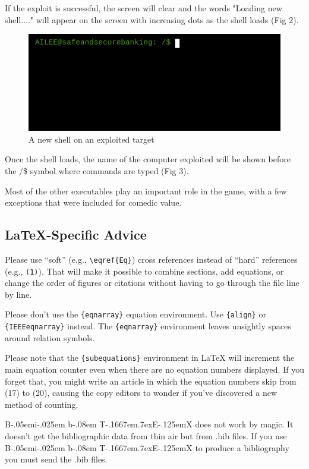 \documentclass[conference]{IEEEtran}
\def\BibTeX{{\rm B\kern-.05em{\sc i\kern-.025em b}\kern-.08em
    T\kern-.1667em\lower.7ex\hbox{E}\kern-.125emX}}
\begin{document}
If the exploit is successful, the screen will clear and the words "Loading new shell...." will appear on the screen with increasing dots as the shell loads (Fig 2).

\begin{figure}[htbp]
	\centerline{\includegraphics[scale=2]{access-granted}}
	\caption{A new shell on an exploited target}
	\label{fig}
\end{figure}

Once the shell loads, the name of the computer exploited will be shown before the /\$ symbol where commands are typed (Fig 3).

Most of the other executables play an important role in the game, with a few exceptions that were included for comedic value.

\subsection{\LaTeX-Specific Advice}

Please use ``soft'' (e.g., \verb|\eqref{Eq}|) cross references instead
of ``hard'' references (e.g., \verb|(1)|). That will make it possible
to combine sections, add equations, or change the order of figures or
citations without having to go through the file line by line.

Please don't use the \verb|{eqnarray}| equation environment. Use
\verb|{align}| or \verb|{IEEEeqnarray}| instead. The \verb|{eqnarray}|
environment leaves unsightly spaces around relation symbols.

Please note that the \verb|{subequations}| environment in {\LaTeX}
will increment the main equation counter even when there are no
equation numbers displayed. If you forget that, you might write an
article in which the equation numbers skip from (17) to (20), causing
the copy editors to wonder if you've discovered a new method of
counting.

{\BibTeX} does not work by magic. It doesn't get the bibliographic
data from thin air but from .bib files. If you use {\BibTeX} to produce a
bibliography you must send the .bib files. 
\end{document}
